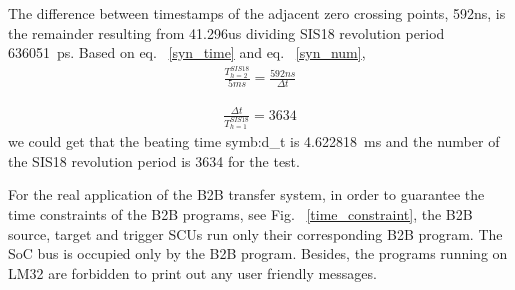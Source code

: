 The difference between timestamps of the adjacent zero crossing points, 592ns, is the remainder resulting from 41.296us dividing SIS18 revolution period \SI{636051}{\ps}. Based on eq. ~\ref{syn_time} and eq. ~\ref{syn_num}, 
\begin{equation}
\begin{aligned}
\frac{T^{SIS18}_{h=2}}{5ms}=\frac{592ns}{\Delta t}
\label {syn_time}
\end{aligned}
\end{equation}

\begin{equation}
\begin{aligned}
\frac{\Delta t}{T^{SIS18}_{h=1}}=3634
\label {syn_num}
\end{aligned}
\end{equation}
we could get that the beating time \gls{symb:d_t} is \SI{4.622818}{\ms} and the number of the SIS18 revolution period is 3634 for the test. 

For the real application of the B2B transfer system, in order to guarantee the time constraints of the B2B programs, see Fig. ~\ref{time_constraint}, the B2B source, target and trigger SCUs run only their corresponding B2B program. The SoC bus is occupied only by the B2B program. Besides, the programs running on LM32 are forbidden to print out any user friendly messages.



